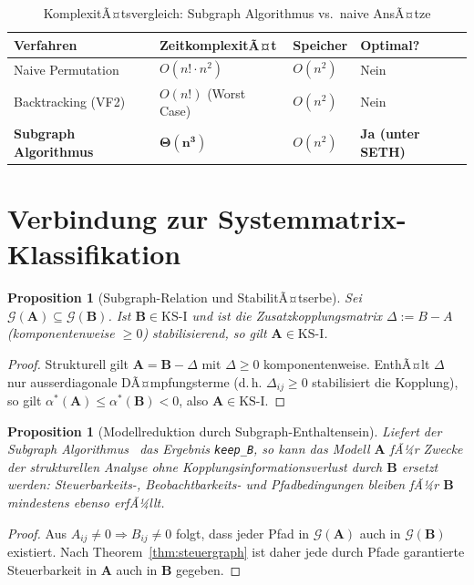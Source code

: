 ﻿\documentclass[12pt, a4paper, titlepage]{report}
\newtheorem{proposition}[theorem]{Proposition}
\theoremstyle{definition}
\theoremstyle{remark}
\newcommand{\vA}{\bm{A}}
\newcommand{\vB}{\bm{B}}
\newcommand{\KS}{\mathrm{KS}}
\begin{document}
\begin{table}[H]
\centering
\caption{KomplexitÃ¤tsvergleich: Subgraph Algorithmus vs.\ naive AnsÃ¤tze}
\label{tab:komplex_subgraph}
\begin{tabular}{llll}
\toprule
Verfahren & ZeitkomplexitÃ¤t & Speicher & Optimal? \\
\midrule
Naive Permutation & $O(n! \cdot n^2)$ & $O(n^2)$ & Nein \\
Backtracking (VF2) & $O(n!)$ (Worst Case) & $O(n^2)$ & Nein \\
\textbf{Subgraph Algorithmus} & $\bm{\Theta(n^3)}$ & $O(n^2)$ & \textbf{Ja (unter SETH)} \\
\bottomrule
\end{tabular}
\end{table}

\section{Verbindung zur Systemmatrix-Klassifikation}

\begin{proposition}[Subgraph-Relation und StabilitÃ¤tserbe]
\label{prop:stabilitaetserbe}
Sei $\mathcal{G}(\vA) \subseteq \mathcal{G}(\vB)$. Ist $\vB \in \KS\text{-I}$ und
ist die Zusatzkopplungsmatrix $\Delta := B - A$ (komponentenweise $\geq 0$)
stabilisierend, so gilt $\vA \in \KS\text{-I}$.
\end{proposition}

\begin{proof}
Strukturell gilt $\vA = \vB - \Delta$ mit $\Delta \geq 0$ komponentenweise.
EnthÃ¤lt $\Delta$ nur ausserdiagonale DÃ¤mpfungsterme (d.\,h. $\Delta_{ij} \geq 0$
stabilisiert die Kopplung), so gilt $\alpha^*(\vA) \leq \alpha^*(\vB) < 0$, also $\vA \in \KS\text{-I}$.
\end{proof}

\begin{proposition}[Modellreduktion durch Subgraph-Enthaltensein]
\label{prop:modellreduktion}
Liefert der Subgraph Algorithmus~\citep{epp2026subgraph} das Ergebnis \texttt{keep\_B},
so kann das Modell $\vA$ fÃ¼r Zwecke der strukturellen Analyse ohne
Kopplungsinformationsverlust durch $\vB$ ersetzt werden: Steuerbarkeits-,
Beobachtbarkeits- und Pfadbedingungen bleiben fÃ¼r $\vB$ mindestens ebenso erfÃ¼llt.
\end{proposition}

\begin{proof}
Aus $A_{ij} \neq 0 \Rightarrow B_{ij} \neq 0$ folgt, dass jeder Pfad in
$\mathcal{G}(\vA)$ auch in $\mathcal{G}(\vB)$ existiert. Nach
Theorem~\ref{thm:steuergraph} ist daher jede durch Pfade garantierte Steuerbarkeit
in $\vA$ auch in $\vB$ gegeben.
\end{proof}
\end{document}
